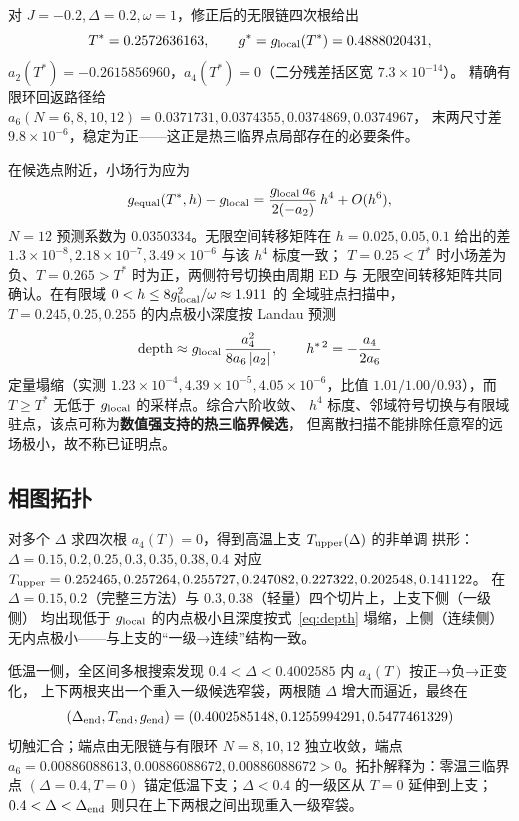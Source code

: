 \documentclass[UTF8,11pt,a4paper]{ctexart}
\begin{document}
对 $J=-0.2,\Delta=0.2,\omega=1$，修正后的无限链四次根给出
\begin{equation}
  T^\ast=0.2572636163,\qquad g^\ast=g_{\rm local}(T^\ast)=0.4888020431,
  \label{eq:candidate}
\end{equation}
$a_2(T^\ast)=-0.2615856960$，$a_4(T^\ast)=0$（二分残差括区宽 $7.3\times10^{-14}$）。
精确有限环回返路径给 $a_6(N{=}6,8,10,12)=0.0371731,0.0374355,0.0374869,0.0374967$，
末两尺寸差 $9.8\times10^{-6}$，稳定为正——这正是热三临界点局部存在的必要条件。

在候选点附近，小场行为应为
\begin{equation}
  g_{\rm equal}(T^\ast,h)-g_{\rm local}
  =\frac{g_{\rm local}\,a_6}{2(-a_2)}\,h^4+O(h^6),
  \label{eq:h4}
\end{equation}
$N=12$ 预测系数为 $0.0350334$。无限空间转移矩阵在 $h=0.025,0.05,0.1$ 给出的差
$1.3\times10^{-8},2.18\times10^{-7},3.49\times10^{-6}$ 与该 $h^4$ 标度一致；
$T=0.25<T^\ast$ 时小场差为负、$T=0.265>T^\ast$ 时为正，两侧符号切换由周期 ED 与
无限空间转移矩阵共同确认。在有限域 $0<h\le8g_{\rm local}^2/\omega\approx1.911$ 的
全域驻点扫描中，$T=0.245,0.25,0.255$ 的内点极小深度按 Landau 预测
\begin{equation}
  \mathrm{depth}\approx g_{\rm local}\,\frac{a_4^2}{8a_6\,|a_2|},\qquad h^{\ast\,2}=-\frac{a_4}{2a_6}
  \label{eq:depth}
\end{equation}
定量塌缩（实测 $1.23\times10^{-4},4.39\times10^{-5},4.05\times10^{-6}$，比值
$1.01/1.00/0.93$），而 $T\ge T^\ast$ 无低于 $g_{\rm local}$ 的采样点。综合六阶收敛、
$h^4$ 标度、邻域符号切换与有限域驻点，该点可称为\textbf{数值强支持的热三临界候选}，
但离散扫描不能排除任意窄的远场极小，故不称已证明点。

\subsection{相图拓扑}

对多个 $\Delta$ 求四次根 $a_4(T)=0$，得到高温上支 $T_{\rm upper}(\Delta)$ 的非单调
拱形：$\Delta=0.15,0.2,0.25,0.3,0.35,0.38,0.4$ 对应
$T_{\rm upper}=0.252465,0.257264,0.255727,0.247082,0.227322,0.202548,0.141122$。
在 $\Delta=0.15,0.2$（完整三方法）与 $0.3,0.38$（轻量）四个切片上，上支下侧（一级侧）
均出现低于 $g_{\rm local}$ 的内点极小且深度按式~\eqref{eq:depth} 塌缩，上侧（连续侧）
无内点极小——与上支的“一级→连续”结构一致。

低温一侧，全区间多根搜索发现 $0.4<\Delta<0.4002585$ 内 $a_4(T)$ 按正→负→正变化，
上下两根夹出一个重入一级候选窄袋，两根随 $\Delta$ 增大而逼近，最终在
\begin{equation}
  (\Delta_{\rm end},T_{\rm end},g_{\rm end})=(0.4002585148,0.1255994291,0.5477461329)
  \label{eq:endpoint}
\end{equation}
切触汇合；端点由无限链与有限环 $N=8,10,12$ 独立收敛，端点
$a_6=0.00886088613,0.00886088672,0.00886088672>0$。拓扑解释为：零温三临界点
$(\Delta=0.4,T=0)$ 锚定低温下支；$\Delta<0.4$ 的一级区从 $T=0$ 延伸到上支；
$0.4<\Delta<\Delta_{\rm end}$ 则只在上下两根之间出现重入一级窄袋。
\end{document}

